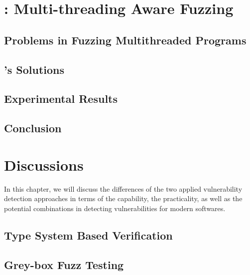 \documentclass[12pt, a4paper, oneside]{Thesis}
\begin{document}
\fancyhead[RE,LO]{\fancyplain{}{\leftmark}}
\renewcommand{\chaptermark}[1]{\markboth{\chaptername\ \thechapter.\ \emph{\mtfuzz: Multi-threading Aware Fuzzing}}{}}


\chapter{\mtfuzz: Multi-threading Aware Fuzzing} \label{Chapter8}

\section{Problems in Fuzzing Multithreaded Programs}


\section{\mtfuzz's Solutions}

\section{Experimental Results}

\section{Conclusion}
 

\fancyhead[RE,LO]{\fancyplain{}{\leftmark}}
\renewcommand{\chaptermark}[1]{\markboth{\chaptername\ \thechapter.\ \emph{Hybrid Approach to Distributed Motion Control}}{}}


\chapter{Discussions} \label{Chapter9}
In this chapter, we will discuss the differences of the two applied vulnerability detection approaches in terms of the capability, the practicality, as well as the potential combinations in detecting vulnerabilities for modern softwares.

\section{Type System Based Verification}

\section{Grey-box Fuzz Testing}
 
\fancyhead[RE,LO]{\fancyplain{}{\leftmark}}
\renewcommand{\chaptermark}[1]{\markboth{\chaptername\ \thechapter.\ \emph{Conclusion and Future Work}}{}}
\end{document}
